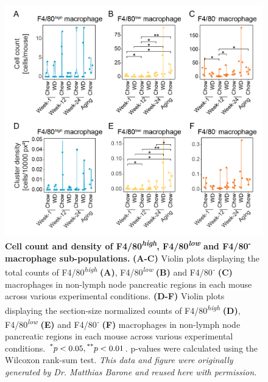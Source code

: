 \begin{figure}[H]
    \centering
    \includegraphics[width=\linewidth]{Appendix2/Fig/F2-A3-01.png}
    \caption[Cell count and density of F4/80 macrophages from  analysis]{\textbf{Cell count and density of F4/80\textsuperscript{\textit{high}}, F4/80\textsuperscript{\textit{low}} and F4/80\textsuperscript{-} macrophage sub-populations.} \textbf{(A-C)} Violin plots displaying the total counts of F4/80\textsuperscript{\textit{high}} \textbf{(A)}, F4/80\textsuperscript{\textit{low}} \textbf{(B)} and F4/80\textsuperscript{\textit{-}} \textbf{(C)} macrophages in non-lymph node pancreatic regions in each mouse across various experimental conditions. \textbf{(D-F)} Violin plots displaying the section-size normalized counts of F4/80\textsuperscript{\textit{high}} \textbf{(D)}, F4/80\textsuperscript{\textit{low}} \textbf{(E)} and F4/80\textsuperscript{\textit{-}} \textbf{(F)} macrophages in non-lymph node pancreatic regions in each mouse across various experimental conditions. $\textsuperscript{*} p < 0.05, \textsuperscript{**} p < 0.01$. p-values were calculated using the Wilcoxon rank-sum test. \textit{This data and figure were originally generated by Dr. Matthias Barone and reused here with permission.}}
    \label{fig:app_imc_macrophages}
\end{figure}



